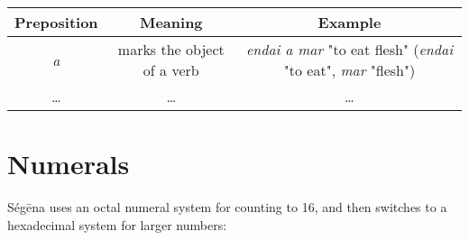 \begin{table}[H]
\begin{tabular}{ c|c|c }
	Preposition & Meaning                    & Example                                                                       \\
	\hline
	\emph{a}    & marks the object of a verb & \emph{endai a mar} "to eat flesh" (\emph{endai} "to eat", \emph{mar} "flesh") \\
	…           & …                          & …                                                                             \\
\end{tabular}
\end{table}

\section{Numerals}

Ségēna uses an octal numeral system for counting to 16, and then switches to a
hexadecimal system for larger numbers:

